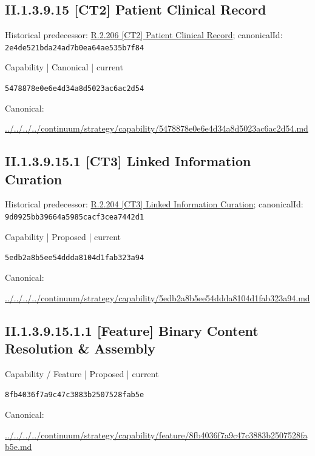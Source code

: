 \documentclass[10pt,a4paper]{article}
\begin{document}
\subsection*{II.1.3.9.15 [CT2] Patient Clinical Record}
Historical predecessor: \hyperref[element-2e4de521bda24ad7b0ea64ae535b7f84]{R.2.206 [CT2] Patient Clinical Record}; canonicalId: \texttt{2e4de521bda24ad7b0ea64ae535b7f84}\par
\label{element-5478878e0e6e4d34a8d5023ac6ac2d54}
{\small Capability | Canonical | current}\par
\texttt{5478878e0e6e4d34a8d5023ac6ac2d54}\par
Canonical: \par
{\footnotesize\url{../../../../continuum/strategy/capability/5478878e0e6e4d34a8d5023ac6ac2d54.md}}\par
\subsection*{II.1.3.9.15.1 [CT3] Linked Information Curation}
Historical predecessor: \hyperref[element-9d0925bb39664a5985cacf3cea7442d1]{R.2.204 [CT3] Linked Information Curation}; canonicalId: \texttt{9d0925bb39664a5985cacf3cea7442d1}\par
\label{element-5edb2a8b5ee54ddda8104d1fab323a94}
{\small Capability | Proposed | current}\par
\texttt{5edb2a8b5ee54ddda8104d1fab323a94}\par
Canonical: \par
{\footnotesize\url{../../../../continuum/strategy/capability/5edb2a8b5ee54ddda8104d1fab323a94.md}}\par
\subsection*{II.1.3.9.15.1.1 [Feature] Binary Content Resolution \& Assembly}
\label{element-8fb4036f7a9c47c3883b2507528fab5e}
{\small Capability / Feature | Proposed | current}\par
\texttt{8fb4036f7a9c47c3883b2507528fab5e}\par
Canonical: \par
{\footnotesize\url{../../../../continuum/strategy/capability/feature/8fb4036f7a9c47c3883b2507528fab5e.md}}\par
\end{document}
